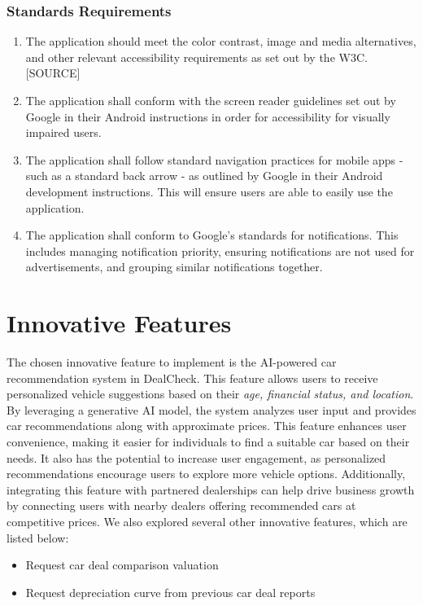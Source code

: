 \documentclass[]{article}
\begin{document}
\subsubsection{Standards Requirements}
\label{ssub:standards_requirements}
\begin{enumerate}[{LR-STD}1. ]
	\item The application should meet the color contrast, image and media alternatives, and other relevant accessibility requirements as set out by the W3C. [SOURCE]
	\item The application shall conform with the screen reader guidelines set out by Google in their Android instructions in order for accessibility for visually impaired users.
	\item The application shall follow standard navigation practices for mobile apps - such as a standard back arrow - as outlined by Google in their Android development instructions. This will ensure users are able to easily use the application.
	\item The application shall conform to Google’s standards for notifications. This includes managing notification priority, ensuring notifications are not used for advertisements, and grouping similar notifications together.
\end{enumerate}



\section{Innovative Features}
\label{sec:innovative_features}
The chosen innovative feature to implement is the AI-powered car recommendation system in DealCheck. This feature allows users to receive personalized vehicle suggestions based on their \textit{age, financial status, and location}. By leveraging a generative AI model, the system analyzes user input and provides car recommendations along with approximate prices. This feature enhances user convenience, making it easier for individuals to find a suitable car based on their needs. It also has the potential to increase user engagement, as personalized recommendations encourage users to explore more vehicle options. Additionally, integrating this feature with partnered dealerships can help drive business growth by connecting users with nearby dealers offering recommended cars at competitive prices. We also explored several other innovative features, which are listed below:
\begin{itemize}
    \item Request car deal comparison valuation
    \item Request depreciation curve from previous car deal reports
\end{itemize}
\end{document}
